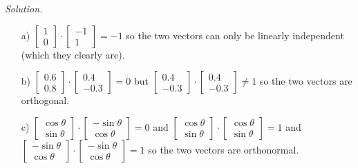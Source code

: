 \documentclass[12pt,pdftex]{article}
\begin{document}
\begin{itemize}
\textit{Solution.}
\begin{itemize}
\item[a)]$\left[\begin{array}{c} 1 \\ 0\end{array}\right] \cdot\left[\begin{array}{c} -1 \\ 1\end{array}\right]=-1$ so the two vectors can only be linearly independent (which they clearly are).
\item[b)] $\left[\begin{array}{c} 0.6 \\ 0.8\end{array}\right]\cdot\left[\begin{array}{r}0.4\\-0.3\end{array}\right]=0$ but $\left[\begin{array}{r}0.4\\-0.3\end{array}\right]\cdot\left[\begin{array}{r}0.4\\-0.3\end{array}\right]\neq1$ so the two vectors are orthogonal.
\item[c)]$\left[\begin{array}{c} \cos\theta \\ \sin\theta \end{array}\right] \cdot
          \left[\begin{array}{r} -\sin\theta \\ \cos\theta \end{array}\right]=0$ and 
          $\left[\begin{array}{c} \cos\theta \\ \sin\theta \end{array}\right] \cdot \left[\begin{array}{c} \cos\theta \\ \sin\theta \end{array}\right]=1$ and 
          $\left[\begin{array}{r} -\sin\theta \\ \cos\theta \end{array}\right]\cdot\left[\begin{array}{r} -\sin\theta \\ \cos\theta \end{array}\right]=1$ so the two vectors are orthonormal.
\end{itemize}


\end{itemize}
\end{document}
